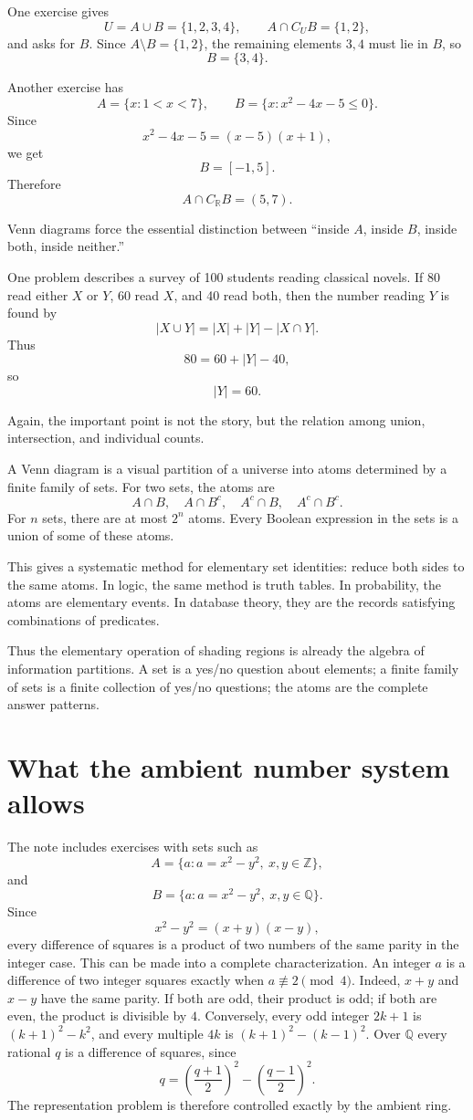 One exercise gives
\[
  U=A\cup B=\{1,2,3,4\},\qquad A\cap C_UB=\{1,2\},
\]
and asks for \(B\).  Since \(A\setminus B=\{1,2\}\), the remaining elements \(3,4\) must lie in \(B\), so
\[
  B=\{3,4\}.
\]

Another exercise has
\[
  A=\{x:1<x<7\},\qquad B=\{x:x^2-4x-5\le0\}.
\]
Since
\[
  x^2-4x-5=(x-5)(x+1),
\]
we get
\[
  B=[-1,5].
\]
Therefore
\[
  A\cap C_{\mathbb R}B=(5,7).
\]

Venn diagrams force the essential distinction between ``inside \(A\), inside \(B\), inside both, inside neither.''

One problem describes a survey of 100 students reading classical novels.  If 80 read either \(X\) or \(Y\), 60 read \(X\), and 40 read both, then the number reading \(Y\) is found by
\[
  |X\cup Y|=|X|+|Y|-|X\cap Y|.
\]
Thus
\[
  80=60+|Y|-40,
\]
so
\[
  |Y|=60.
\]

Again, the important point is not the story, but the relation among union, intersection, and individual counts.

A Venn diagram is a visual partition of a universe into atoms determined by a finite family of sets.  For two sets, the atoms are
\[
  A\cap B,\quad A\cap B^c,\quad A^c\cap B,\quad A^c\cap B^c.
\]
For $n$ sets, there are at most $2^n$ atoms.  Every Boolean expression in the sets is a union of some of these atoms.

This gives a systematic method for elementary set identities: reduce both sides to the same atoms.  In logic, the same method is truth tables.  In probability, the atoms are elementary events.  In database theory, they are the records satisfying combinations of predicates.

Thus the elementary operation of shading regions is already the algebra of information partitions.  A set is a yes/no question about elements; a finite family of sets is a finite collection of yes/no questions; the atoms are the complete answer patterns.

\section{What the ambient number system allows}

The note includes exercises with sets such as
\[
  A=\{a:a=x^2-y^2,\ x,y\in\mathbb Z\},
\]
and
\[
  B=\{a:a=x^2-y^2,\ x,y\in\mathbb Q\}.
\]
Since
\[
  x^2-y^2=(x+y)(x-y),
\]
every difference of squares is a product of two numbers of the same parity in the integer case.  This can be made into a complete characterization. An integer \(a\) is a difference of two integer squares exactly when \(a\not\equiv2\pmod4\). Indeed, \(x+y\) and \(x-y\) have the same parity. If both are odd, their product is odd; if both are even, the product is divisible by \(4\). Conversely, every odd integer \(2k+1\) is \((k+1)^2-k^2\), and every multiple \(4k\) is \((k+1)^2-(k-1)^2\). Over \(\mathbb Q\) every rational \(q\) is a difference of squares, since
\[
 q=\left(\frac{q+1}{2}\right)^2-\left(\frac{q-1}{2}\right)^2.
\]
The representation problem is therefore controlled exactly by the ambient ring.

